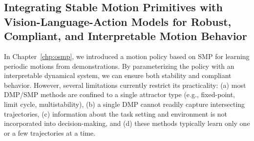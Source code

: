 \subsection{Integrating Stable Motion Primitives with Vision-Language-Action Models for Robust, Compliant, and Interpretable Motion Behavior}
In Chapter~\ref{chp:osmp}, we introduced a motion policy based on \gls{SMP} for learning periodic motions from demonstrations. By parameterizing the policy with an interpretable dynamical system, we can ensure both stability and compliant behavior. However, several limitations currently restrict its practicality: (a) most \gls{DMP}/\gls{SMP} methods are confined to a single attractor type (e.g., fixed-point, limit cycle, multistability), (b) a single \gls{DMP} cannot readily capture intersecting trajectories, (c) information about the task setting and environment is not incorporated into decision-making, and (d) these methods typically learn only one or a few trajectories at a time.

